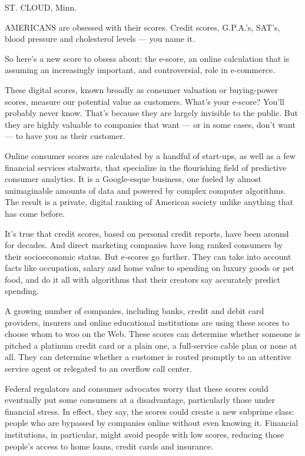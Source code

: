 ST. CLOUD, Minn.

AMERICANS are obsessed with their scores. Credit scores, G.P.A.'s,
SAT's, blood pressure and cholesterol levels --- you name it.

So here's a new score to obsess about: the e-score, an online
calculation that is assuming an increasingly important, and
controversial, role in e-commerce.

These digital scores, known broadly as consumer valuation or
buying-power scores, measure our potential value as customers. What's
your e-score? You'll probably never know. That's because they are
largely invisible to the public. But they are highly valuable to
companies that want --- or in some cases, don't want --- to have you as
their customer.

Online consumer scores are calculated by a handful of start-ups, as well
as a few financial services stalwarts, that specialize in the
flourishing field of predictive consumer analytics. It is a Google-esque
business, one fueled by almost unimaginable amounts of data and powered
by complex computer algorithms. The result is a private, digital ranking
of American society unlike anything that has come before.

It's true that credit scores, based on personal credit reports, have
been around for decades. And direct marketing companies have long ranked
consumers by their socioeconomic status. But e-scores go further. They
can take into account facts like occupation, salary and home value to
spending on luxury goods or pet food, and do it all with algorithms that
their creators say accurately predict spending.

A growing number of companies, including banks, credit and debit card
providers, insurers and online educational institutions are using these
scores to choose whom to woo on the Web. These scores can determine
whether someone is pitched a platinum credit card or a plain one, a
full-service cable plan or none at all. They can determine whether a
customer is routed promptly to an attentive service agent or relegated
to an overflow call center.

Federal regulators and consumer advocates worry that these scores could
eventually put some consumers at a disadvantage, particularly those
under financial stress. In effect, they say, the scores could create a
new subprime class: people who are bypassed by companies online without
even knowing it. Financial institutions, in particular, might avoid
people with low scores, reducing those people's access to home loans,
credit cards and insurance.

